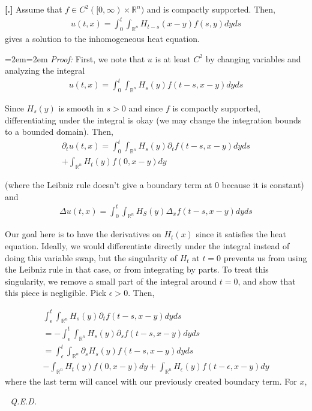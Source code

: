 \documentclass{article}
\newcommand{\R}{{\mathbb{R}}}
\newcommand{\pd}{\partial}
\newcounter{result}[section]
\newenvironment{res}[1][]{\refstepcounter{result}\par\medskip
	\noindent \textbf{[\thesection.\theresult] #1} \rmfamily}{\medskip}
\newenvironment{pf}{%
	\par%
	\medskip
	\leftskip=2em\rightskip=2em%
	\noindent\ignorespaces \textit{Proof:} \newline}{%
	\,\, \newline \textit{Q.E.D.}\par\medskip}
\begin{document}
	\begin{res} 
		Assume that $f \in C^{2}([0,\infty) \times \R^{n})$ and is compactly supported. Then,
		\begin{align*}
			u(t,x) = \int_{0}^{t} \int_{\R^{n}} H_{t-s}(x-y)f(s,y) dyds
		\end{align*} 
		gives a solution to the inhomogeneous heat equation. 
	\end{res}
	\begin{pf}
		First, we note that $u$ is at least $C^{2}$ by changing variables and analyzing the integral
		\begin{align*}
			u(t,x) = \int_{0}^{t} \int_{\R^{n}} H_{s}(y) f(t-s,x-y) dyds
		\end{align*}
		
		Since $H_{s}(y)$ is smooth in $s>0$ and since $f$ is compactly supported, differentiating under the integral is okay (we may change the integration bounds to a bounded domain). Then,
		\begin{align*}
			\pd_{t}u(t,x) = \int_{0}^{t} \int_{\R^{n}} H_{s}(y) \pd_{t} f(t-s,x-y) dyds \\
			+ \int_{\R^{n}} H_{t}(y) f (0,x-y) dy
		\end{align*}
		
		(where the Leibniz rule doesn't give a boundary term at $0$ because it is constant) and 
		\begin{align*}
			\Delta u(t,x) = \int_{0}^{t} \int_{\R^{n}} H_{S}(y) \Delta_{x} f(t-s,x-y) dyds
		\end{align*}
		
		
		Our goal here is to have the derivatives on $H_{t}(x)$ since it satisfies the heat equation. Ideally, we would differentiate directly under the integral instead of doing this variable swap, but the singularity of $H_{t}$ at $t=0$ prevents us from using the Leibniz rule in that case, or from integrating by parts. To treat this singularity, we remove a small part of the integral around $t=0$, and show that this piece is negligible. Pick $\epsilon > 0$. Then,
		
		\begin{align*}
			\int_{\epsilon}^{t} \int_{\R^{n}} H_{s}(y) \pd_{t}f(t-s,x-y) dyds \\
			= -\int_{\epsilon}^{t} \int_{\R^{n}} H_{s}(y) \pd_{s}f(t-s,x-y) dyds \\
			= \int_{\epsilon}^{t} \int_{\R^{n}} \pd_{s}H_{s}(y) f(t-s,x-y) dyds \\
			- \int_{\R^{n}} H_{t}(y)f(0,x-y) dy + \int_{\R^{n}} H_{\epsilon}(y) f(t-\epsilon,x-y)dy
		\end{align*}
		where the last term will cancel with our previously created boundary term. For $x$,
		

\end{pf}
\end{document}
